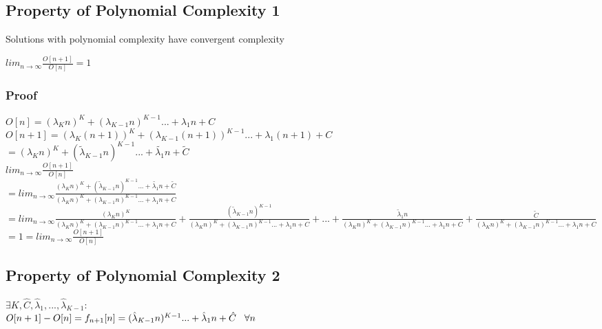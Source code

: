\documentclass[11pt]{article}
\begin{document}
\subsection{Property of Polynomial  Complexity 1}
Solutions with polynomial complexity have convergent complexity
\begin{center}
$
lim_{n \rightarrow \infty} \frac{O[n+1]}{O[n]} = 1
$
\end{center}
\subsubsection{Proof}
\begin{center}
$
O[n] = (\lambda_K n)^K + (\lambda_{K-1} n)^{K-1}... + \lambda_1 n + C
$
\\ \vspace{2mm}
$
O[n+1] = (\lambda_K (n+1))^K + (\lambda_{K-1} (n+1))^{K-1}... + \lambda_1 (n+1) + C
$
\\ \vspace{2mm}
$ 
=  (\lambda_K n)^K + (\tilde{\lambda}_{K-1} n)^{K-1}... + \tilde{\lambda_1} n + \tilde{C}
$
\\ \vspace{5mm}
$
lim_{n \rightarrow \infty} \frac{O[n+1]}{O[n]}
$
\\ \vspace{3mm}
$
= lim_{n \rightarrow \infty} \frac{ (\lambda_K n)^K + (\tilde{\lambda}_{K-1} n)^{K-1}... + \tilde{\lambda_1} n + \tilde{C}}{(\lambda_K n)^K + (\lambda_{K-1} n)^{K-1}... + \lambda_1 n + C}
$
\\ \vspace{3mm}
$
= lim_{n \rightarrow \infty} \frac{ (\lambda_K n)^K}{(\lambda_K n)^K + (\lambda_{K-1} n)^{K-1}... + \lambda_1 n + C} + \frac{ (\tilde{\lambda}_{K-1} n)^{K-1}}{(\lambda_K n)^K + (\lambda_{K-1} n)^{K-1}... + \lambda_1 n + C} + ... + \frac{ \tilde{\lambda}_1 n}{(\lambda_K n)^K + (\lambda_{K-1} n)^{K-1}... + \lambda_1 n + C} +  \frac{ \tilde{C}}{(\lambda_K n)^K + (\lambda_{K-1} n)^{K-1}... + \lambda_1 n + C}
$
\\ \vspace{3mm}
$
= 1 = lim_{n \rightarrow \infty} \frac{O[n+1]}{O[n]}
$
\end{center}







\subsection{Property of Polynomial Complexity 2}
\begin{center}
$
\exists K,\hat{C},\hat{\lambda}_1,...,\hat{\lambda}_{K-1} :
$
\\ \vspace{2mm}
$
O[n+1] - O[n] = f_{n+1}[n] = (\hat{\lambda}_{K-1} n)^{K-1}... + \hat{\lambda}_1 n + \hat{C} \hspace{3mm} \forall n
$
\end{center}
\end{document}
